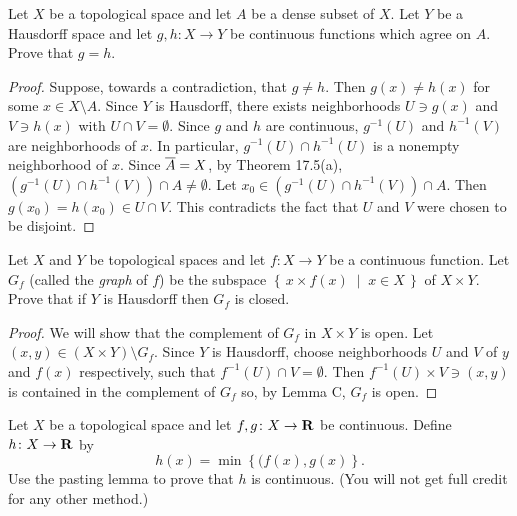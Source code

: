 \begin{problem}
Let $X$ be a topological space and let $A$ be a dense subset of
$X$. Let $Y$ be a Hausdorff space and let $g,h\colon X\to Y$ be
continuous functions which agree on $A$. Prove that $g=h$.
\end{problem}
\begin{proof}
Suppose, towards a contradiction, that $g\neq h$. Then $g(x)\neq
h(x)$ for some $x\in X\setminus A$. Since $Y$ is Hausdorff, there
exists neighborhoods $U\ni g(x)$ and $V\ni h(x)$ with $U\cap
V=\emptyset$. Since $g$ and $h$ are continuous, $g^{-1}(U)$ and
$h^{-1}(V)$ are neighborhoods of $x$. In particular,
$g^{-1}(U)\cap h^{-1}(U)$ is a nonempty neighborhood of
$x$. Since $\overline{A}=X$, by Theorem 17.5(a), $\left(g^{-1}(U)\cap
h^{-1}(V)\right)\cap A\neq\emptyset$. Let $x_0\in\left(g^{-1}(U)\cap
h^{-1}(V)\right)\cap A$. Then $g(x_0)=h(x_0)\in U\cap V$. This
contradicts the fact that $U$ and $V$ were chosen to be
disjoint.
\end{proof}
\begin{problem}
Let $X$ and $Y$ be topological spaces and let $f\colon X\to Y$
be a continuous function. Let $G_f$ (called the \emph{graph} of
$f$) be the subspace $\left\{\,x\times f(x)\;\middle|\;x\in
  X\,\right\}$ of $X\times Y$. Prove that if $Y$ is Hausdorff then
$G_f$ is closed.
\end{problem}
\begin{proof}
We will show that the complement of $G_f$ in $X\times Y$ is
open. Let $(x,y)\in(X\times Y)\setminus G_f$. Since $Y$ is
Hausdorff, choose neighborhoods $U$ and $V$ of $y$ and $f(x)$
respectively, such that $f^{-1}(U)\cap V=\emptyset$. Then
$f^{-1}(U)\times V\ni(x,y)$ is contained in the complement of
$G_f$ so, by Lemma C, $G_f$ is open.
\end{proof}
\begin{problem}
Let $X$ be a topological space and let $f,g\colon X\to\mathbf{R}$ be
continuous. Define $h\colon X\to\mathbf{R}$ by
\[
h(x)=\min\left\{(f(x),g(x)\right\}.
\]
Use the pasting lemma to prove that $h$ is continuous. (You will
not get full credit for any other method.)
\end{problem}
